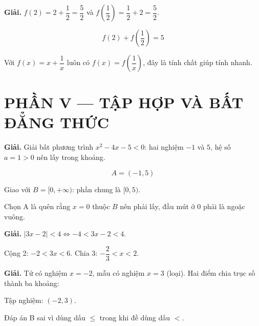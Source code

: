 \documentclass[11pt, a4paper]{article}
\begin{document}
\vspace{0.3cm}
\begin{dapan}[31 — Đáp án C]

\textbf{Giải.} $f(2) = 2 + \dfrac{1}{2} = \dfrac{5}{2}$ và $f\!\left(\dfrac{1}{2}\right) = \dfrac{1}{2} + 2 = \dfrac{5}{2}$.

$$f(2) + f\!\left(\dfrac{1}{2}\right) = 5$$

 Với $f(x) = x + \dfrac{1}{x}$ luôn có $f(x) = f\!\left(\dfrac{1}{x}\right)$, đây là tính chất giúp tính nhanh.

\section{PHẦN V — TẬP HỢP VÀ BẤT ĐẲNG THỨC}


\end{dapan}
\vspace{0.3cm}
\begin{dapan}[32 — Đáp án B]

\textbf{Giải.} Giải bất phương trình $x^2 - 4x - 5 < 0$: hai nghiệm $-1$ và $5$, hệ số $a = 1 > 0$ nên lấy trong khoảng.

$$A = (-1, 5)$$

Giao với $B = [0, +\infty)$: phần chung là $[0, 5)$.

 Chọn A là quên rằng $x = 0$ thuộc $B$ nên phải lấy, đầu mút ở 0 phải là ngoặc vuông.


\end{dapan}
\vspace{0.3cm}
\begin{dapan}[33 — Đáp án A]

\textbf{Giải.} $\lvert 3x - 2 \rvert < 4 \iff -4 < 3x - 2 < 4$.

Cộng 2: $-2 < 3x < 6$. Chia 3: $-\dfrac{2}{3} < x < 2$.


\end{dapan}
\vspace{0.3cm}
\begin{dapan}[34 — Đáp án C]

\textbf{Giải.} Tử có nghiệm $x = -2$, mẫu có nghiệm $x = 3$ (loại). Hai điểm chia trục số thành ba khoảng:


Tập nghiệm: $(-2, 3)$.

 Đáp án B sai vì dùng dấu $\le$ trong khi đề dùng dấu $<$.


\end{dapan}
\end{document}
